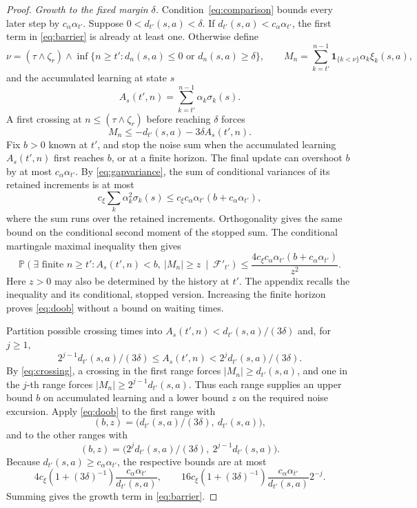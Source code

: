 \begin{proof}
\emph{Growth to the fixed margin $\delta$.} Condition~\eqref{eq:comparison} bounds every later step by $c_\alpha\alpha_{t'}$. Suppose $0<d_{t'}(s,a)<\delta$. If $d_{t'}(s,a)<c_\alpha\alpha_{t'}$, the first term in \eqref{eq:barrier} is already
at least one. Otherwise define
\[
\nu=(\tau\wedge\zeta_r)\wedge\inf\{n\ge t':d_n(s,a)\le0\text{ or }d_n(s,a)\ge\delta\},\qquad
M_n=\sum_{k=t'}^{n-1}\mathbf1_{\{k<\nu\}}\alpha_k\xi_k(s,a),
\]
and the accumulated learning at state $s$
\begin{equation}\label{eq:clock}
A_s(t',n)=\sum_{k=t'}^{n-1}\alpha_k\sigma_k(s).
\end{equation}
A first crossing at $n\le(\tau\wedge\zeta_r)$ before reaching $\delta$ forces
\begin{equation}\label{eq:crossing}
M_n\le-d_{t'}(s,a)-3\delta A_s(t',n).
\end{equation}
Fix $b>0$ known at $t'$, and stop the noise sum when the accumulated learning $A_s(t',n)$ first reaches $b$, or at a finite horizon. The final update can overshoot $b$ by at most $c_\alpha\alpha_{t'}$. By \eqref{eq:gapvariance}, the sum of conditional variances of its retained increments is at most
\[
c_\xi\sum_k\alpha_k^2\sigma_k(s)
\le c_\xi c_\alpha\alpha_{t'}(b+c_\alpha\alpha_{t'}),
\]
where the sum runs over the retained increments. Orthogonality gives the same bound on the conditional second moment of the stopped sum. The conditional martingale maximal inequality then gives
\begin{equation}\label{eq:doob}
\mathbb P\!\left(\exists\text{ finite }n\ge t':
A_s(t',n)<b,\ |M_n|\ge z\ \middle|\ \mathcal F'_{t'}\right)
\le\frac{4c_\xi c_\alpha\alpha_{t'}(b+c_\alpha\alpha_{t'})}{z^2}.
\end{equation}
Here $z>0$ may also be determined by the history at $t'$. The appendix recalls the inequality and its conditional, stopped version. Increasing the finite horizon proves \eqref{eq:doob} without a bound on waiting times.

Partition possible crossing times into $A_s(t',n)<d_{t'}(s,a)/(3\delta)$ and, for $j\ge1$,
\[
2^{j-1}d_{t'}(s,a)/(3\delta)\le A_s(t',n)<2^jd_{t'}(s,a)/(3\delta).
\]
By \eqref{eq:crossing}, a crossing in the first range forces $|M_n|\ge d_{t'}(s,a)$, and one in the $j$-th range forces $|M_n|\ge2^{j-1}d_{t'}(s,a)$. Thus each range supplies an upper bound $b$ on accumulated learning and a lower bound $z$ on the required noise excursion. Apply \eqref{eq:doob} to the first range with
\[
(b,z)=\big(d_{t'}(s,a)/(3\delta),\ d_{t'}(s,a)\big),
\]
and to the other ranges with
\[
(b,z)=\big(2^jd_{t'}(s,a)/(3\delta),\ 2^{j-1}d_{t'}(s,a)\big).
\]
Because $d_{t'}(s,a)\ge c_\alpha\alpha_{t'}$, the respective bounds are at most
\[
4c_\xi(1+(3\delta)^{-1})\frac{c_\alpha\alpha_{t'}}{d_{t'}(s,a)},\qquad
16c_\xi(1+(3\delta)^{-1})\frac{c_\alpha\alpha_{t'}}{d_{t'}(s,a)}2^{-j}.
\]
Summing gives the growth term in \eqref{eq:barrier}.


\end{proof}
